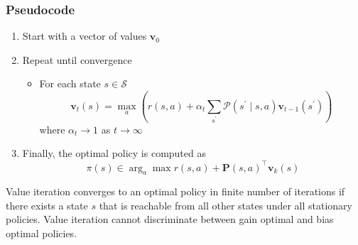 \subsubsection*{Pseudocode}
\begin{enumerate}
    \item Start with a vector of values $\mathbf{v}_0$
    \item Repeat until convergence 
    
    \begin{itemize}
        \item For each state $s \in \mathcal{S}$
        $$\mathbf{v}_t(s) = \max_a \left(r(s, a) + \alpha_t \sum_{s^\prime} \mathcal{P}(s^\prime \mid s, a) \mathbf{v}_{t-1}(s^\prime) \right)$$
        where $\alpha_t \to 1$ as $t \to \infty$
    \end{itemize}
    
    
    \item Finally, the optimal policy is computed as
    $$\pi(s) \in \arg_a\max r(s,a) + \mathbf{P}(s,a)^\top \mathbf{v}_k(s) $$
    
\end{enumerate}

Value iteration converges to an optimal policy in finite number of iterations if there exists a state $s$ that is reachable from all other states under all stationary policies.
Value iteration cannot discriminate between gain optimal and bias optimal policies.


